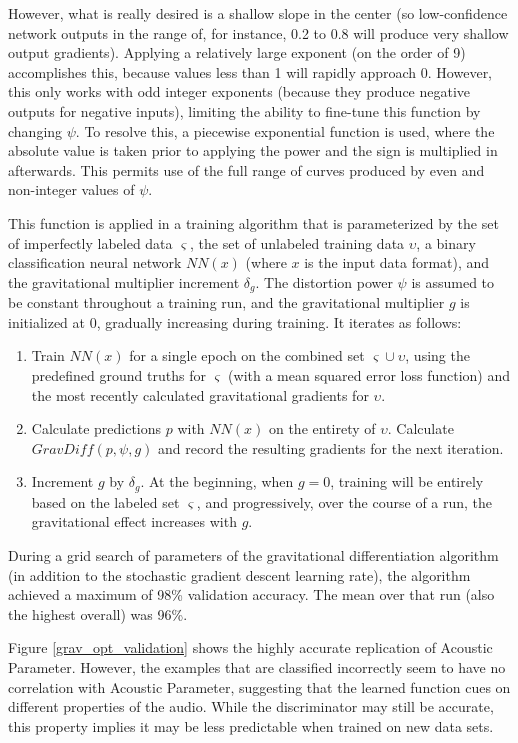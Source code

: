 \documentclass[10pt]{article}
\begin{document}
However, what is really desired is a shallow slope in the center (so low-confidence network outputs in the range of, for instance, 0.2 to 0.8 will produce very shallow output gradients). Applying a relatively large exponent (on the order of 9) accomplishes this, because values less than 1 will rapidly approach 0. However, this only works with odd integer exponents (because they produce negative outputs for negative inputs), limiting the ability to fine-tune this function by changing $\psi$. To resolve this, a piecewise exponential function is used, where the absolute value is taken prior to applying the power and the sign is multiplied in afterwards. This permits use of the full range of curves produced by even and non-integer values of $\psi$.

This function is applied in a training algorithm that is parameterized by the set of imperfectly labeled data $\varsigma$, the set of unlabeled training data $\upsilon$, a binary classification neural network $NN(x)$ (where $x$ is the input data format), and the gravitational multiplier increment $\delta_g$. The distortion power $\psi$ is assumed to be constant throughout a training run, and the gravitational multiplier $g$ is initialized at 0, gradually increasing during training. It iterates as follows:

\begin{enumerate}
    \item Train $NN(x)$ for a single epoch on the combined set $\varsigma \cup \upsilon$, using the predefined ground truths for $\varsigma$ (with a mean squared error loss function) and the most recently calculated gravitational gradients for $\upsilon$.
    \item Calculate predictions $p$ with $NN(x)$ on the entirety of $\upsilon$. Calculate $GravDiff(p, \psi, g)$ and record the resulting gradients for the next iteration.
    \item Increment $g$ by $\delta_{g}$. At the beginning, when $g = 0$, training will be entirely based on the labeled set $\varsigma$, and progressively, over the course of a run, the gravitational effect increases with $g$.
\end{enumerate}

During a grid search of parameters of the gravitational differentiation algorithm (in addition to the stochastic gradient descent learning rate), the algorithm achieved a maximum of 98\% validation accuracy. The mean over that run (also the highest overall) was 96\%.

Figure \ref{grav_opt_validation} shows the highly accurate replication of Acoustic Parameter. However, the examples that are classified incorrectly seem to have no correlation with Acoustic Parameter, suggesting that the learned function cues on different properties of the audio. While the discriminator may still be accurate, this property implies it may be less predictable when trained on new data sets.
\end{document}
